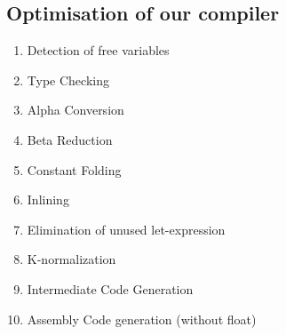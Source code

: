 \documentclass[a4paper,10pt]{article}
\begin{document}
	\subsection{Optimisation of our compiler}
	\begin{enumerate}
		\item Detection of free variables
		\item Type Checking
		\item Alpha Conversion
		\item Beta Reduction
		\item Constant Folding
    	\item Inlining
    	\item Elimination of unused let-expression
    	\item K-normalization
		\item Intermediate Code Generation
		\item Assembly Code generation (without float)
	\end{enumerate}
		
\end{document}

